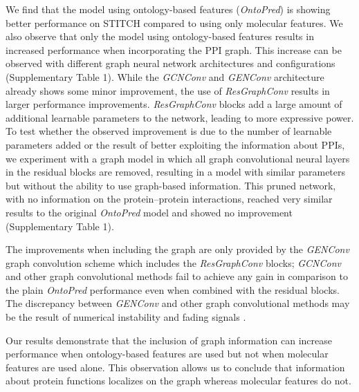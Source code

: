 \documentclass{bioinfo}
\renewcommand{\cite}{\citep}
\begin{document}
We find that the model using ontology-based features
(\textit{OntoPred}) is showing better performance on STITCH compared
to using only molecular features. We also observe that only the model
using ontology-based features results in increased performance when
incorporating the PPI graph. This increase can be observed with
different graph neural network architectures and configurations
(Supplementary Table 1). While the {\em
  GCNConv} and {\em GENConv} architecture already shows some minor
improvement, the use of \textit{ResGraphConv} results in larger
performance improvements.  {\em ResGraphConv} blocks add a large
amount of additional learnable parameters to the network, leading to
more expressive power. To test whether the observed improvement is due
to the number of learnable parameters added or the result of better
exploiting the information about PPIs, we experiment with a graph
model in which all graph convolutional neural layers in the residual
blocks are removed, resulting in a model with similar parameters but
without the ability to use graph-based information. This pruned
network, with no information on the protein--protein interactions,
reached very similar results to the original \textit{OntoPred} model
and showed no improvement (Supplementary Table 1).

The improvements when including the graph are only provided by the
\textit{GENConv} graph convolution scheme which includes the
{\em ResGraphConv} blocks; \textit{GCNConv} and other graph
convolutional methods fail to achieve any gain in comparison to the
plain \textit{OntoPred} performance even when combined with the
residual blocks. The discrepancy between {\em GENConv} and other graph
convolutional methods may be the result of numerical instability and
fading signals \cite{DeeperGCN2020}.

Our results demonstrate that the inclusion of graph information
can increase performance when ontology-based features are used but not
when molecular features are used alone. This observation allows us to
conclude that information about protein functions localizes on the
graph whereas molecular features do not.

\end{document}
